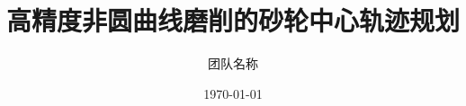 \documentclass[12pt,a4paper]{ctexart}
\title{高精度非圆曲线磨削的砂轮中心轨迹规划}
\author{团队名称}
\date{\today}
\begin{document}
\maketitle

\begin{abstract}
\end{abstract}

\tableofcontents
\newpage









\end{document}
